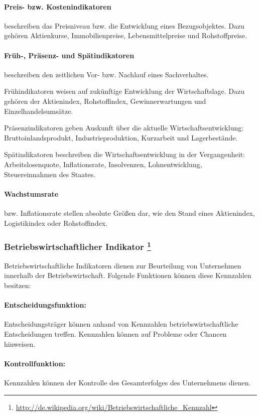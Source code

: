 \paragraph{Preis- bzw. Kostenindikatoren} beschreiben das Preisniveau bzw. die Entwicklung eines Bezugsobjektes. Dazu gehören Aktienkurse, Immobilienpreise, Lebensmittelpreise und Rohstoffpreise.
\paragraph{Früh-, Präsenz- und Spätindikatoren} beschreiben den zeitlichen Vor- bzw. Nachlauf eines Sachverhaltes. 

Frühindikatoren weisen auf zukünftige Entwicklung der Wirtschaftslage. Dazu gehören der Aktienindex, Rohstoffindex, Gewinnerwartungen und Einzelhandelsumsätze. 

Präsenzindikatoren geben Auskunft über die aktuelle Wirtschaftsentwicklung: Bruttoinlandsprodukt, Industrieproduktion, Kurzarbeit und Lagerbe\-stände.

Spätindikatoren beschreiben die Wirtschaftsentwicklung in der Vergangenheit: Arbeitslosenquote, Inflationsrate, Insolvenzen, Lohnentwicklung, Steu\-ereinnahmen des Staates.

\paragraph{Wachstumsrate} bzw. Inflationsrate stellen absolute Größen dar, wie den Stand eines Aktienindex, Logistikindex oder Rohstoffindex.
   

\subsubsection[Betriebswirtschaftlicher Indikator]{Betriebswirtschaftlicher Indikator \footnote{\url{http://de.wikipedia.org/wiki/Betriebswirtschaftliche_Kennzahl}}}
Betriebswirtschaftliche Indikatoren dienen zur Beurteilung von Unternehmen innerhalb der Betriebswirtschaft. Folgende Funktionen können diese Kennzahlen besitzen:

\paragraph{Entscheidungsfunktion:} Entscheidungsträger können anhand von Kennzahlen betriebswirtschaftliche Entscheidungen treffen. Kennzahlen können auf Probleme oder Chancen hinweisen.
\paragraph{Kontrollfunktion:} Kennzahlen können der Kontrolle des Gesamterfolges des Unternehmens dienen.
